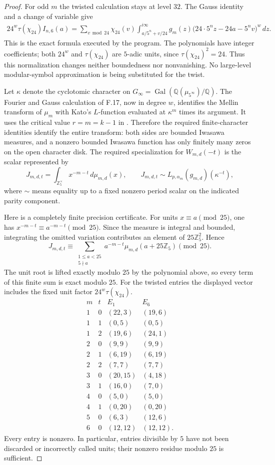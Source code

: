 \begin{proof}
For odd $m$ the twisted calculation stays at level $32$.
The Gauss identity and a change of variable give
\[
\begin{split}
24^w\tau(\chi_{24})I_{n,6}(a)
  =\sum_{v\bmod24}\chi_{24}(v)
    \int_{a/5^n+v/24}^{i\infty}
       g_m(z)\bigl(24\cdot5^nz-24a-5^nv\bigr)^w\,dz.
\end{split}
\]
This is the exact formula executed by the program. The
polynomials have integer coefficients; both $24^w$ and
$\tau(\chi_{24})$ are $5$-adic units, since
$\tau(\chi_{24})^2=24$. Thus this normalization changes
neither boundedness nor nonvanishing. No large-level
modular-symbol approximation is being substituted for the twist.

Let $\kappa$ denote the cyclotomic character on
$G_\infty=\operatorname{Gal}(\mathbb Q(\mu_{5^\infty})/\mathbb Q)$.
The Fourier and Gauss calculation of F.17, now in degree $w$,
identifies the Mellin transform of $\mu_m$ with Kato's
$L$-function evaluated at $\kappa^m$ times its argument.
It uses the critical value $r=m=k-1$ in
\citet[Theorem~16.2]{FA_Kato2004}. Therefore the required
finite-character identities identify the entire transform:
both sides are bounded Iwasawa measures, and a nonzero
bounded Iwasawa function has only finitely many zeros on
the open character disk. The required
specialization for $W_{m,d}(-t)$ is the scalar represented by
\[
 J_{m,d,t}=\int_{\mathbb Z_5^\times}x^{-m-t}\,d\mu_{m,d}(x),
 \qquad
 J_{m,d,t}\sim L_{p,\alpha_m}(g_{m,d})(\kappa^{-t}),
\]
where $\sim$ means equality up to a fixed nonzero period
scalar on the indicated parity component.

Here is a completely finite precision certificate. For units
$x\equiv a\pmod {25}$, one has
$x^{-m-t}\equiv a^{-m-t}\pmod {25}$. Since the measure is
integral and bounded, integrating the omitted variation
contributes an element of $25\mathbb Z_5^2$. Hence
\[
 J_{m,d,t}\equiv
 \sum_{\substack{1\le a<25\\5\nmid a}}
     a^{-m-t}\mu_{m,d}(a+25\mathbb Z_5)\pmod {25}.
\]
The unit root is lifted exactly modulo $25$ by the polynomial
above, so every term of this finite sum is exact modulo $25$.
For the twisted entries the displayed vector includes the
fixed unit factor $24^w\tau(\chi_{24})$.
\[
\begin{array}{cc|cc}
m&t&E_1&E_6\\\hline
1&0&(22,3)&(19,6)\\
1&1&(0,5)&(0,5)\\
1&2&(19,6)&(24,1)\\
2&0&(9,9)&(9,9)\\
2&1&(6,19)&(6,19)\\
2&2&(7,7)&(7,7)\\
3&0&(20,15)&(4,18)\\
3&1&(16,0)&(7,0)\\
4&0&(5,0)&(5,0)\\
4&1&(0,20)&(0,20)\\
5&0&(6,3)&(12,6)\\
6&0&(12,12)&(12,12).
\end{array}
\]
Every entry is nonzero. In particular, entries divisible by
$5$ have not been discarded or incorrectly called units;
their nonzero residue modulo $25$ is sufficient.


\end{proof}

